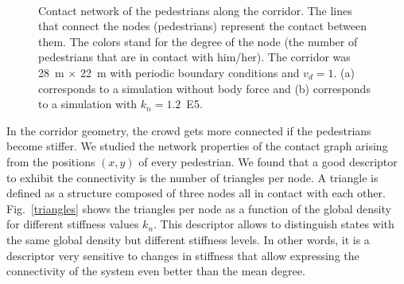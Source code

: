\documentclass[preprint,12pt]{elsarticle}
\begin{document}
\begin{figure}[!htbp]
\centering
    \ 
    \\
\caption[width=0.47\columnwidth]{Contact network of the pedestrians along the corridor. The lines that connect the nodes (pedestrians) represent the contact between them. The colors stand for the degree of the node (the number of pedestrians that are in contact with him/her). The corridor was 28~m $\times$ 22~m with periodic boundary conditions and $v_d=1$. (a) corresponds to a simulation without body force and (b) corresponds to a simulation with $k_n=1.2$~E5.}
\label{network_corridor}
\end{figure}

In the corridor geometry, the crowd gets more connected if the pedestrians become stiffer. We studied the network properties of the contact graph arising from the positions $(x,y)$ of every pedestrian. We found that a good descriptor to exhibit the connectivity is the number of triangles per node. A triangle is defined as a structure composed of three nodes all in contact with each other. Fig.~\ref{triangles} shows the triangles per node as a function of the global density for different stiffness values $k_n$. This descriptor allows to distinguish states with the same global density but different stiffness levels. In other words, it is a descriptor very sensitive to changes in stiffness that allow expressing the connectivity of the system even better than the mean degree. \\
\end{document}
